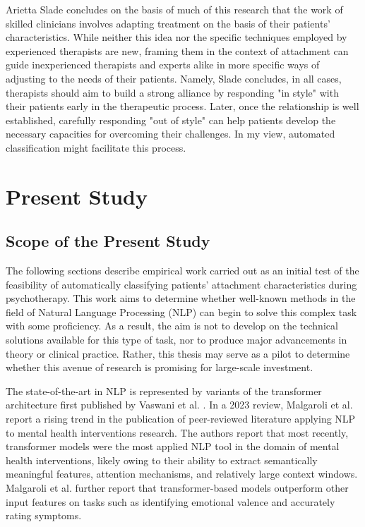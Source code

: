 \documentclass[12pt]{report}
\begin{document}
Arietta Slade \citeyear{Slade2016} concludes on the basis of much of this research that the work of skilled clinicians involves adapting treatment on the basis of their patients' characteristics.
While neither this idea nor the specific techniques employed by experienced therapists are new, framing them in the context of attachment can guide inexperienced therapists and experts alike in more specific ways of adjusting to the needs of their patients.
Namely, Slade \citeyear{Slade2016} concludes, in all cases, therapists should aim to build a strong alliance by responding "in style" with their patients early in the therapeutic process.
Later, once the relationship is well established, carefully responding "out of style" can help patients develop the necessary capacities for overcoming their challenges.
In my view, automated classification might facilitate this process.

\chapter{Present Study}
\section{Scope of the Present Study}
The following sections describe empirical work carried out as an initial test of the feasibility of automatically classifying patients' attachment characteristics during psychotherapy.
This work aims to determine whether well-known methods in the field of Natural Language Processing (NLP) can begin to solve this complex task with some proficiency.
As a result, the aim is not to develop on the technical solutions available for this type of task, nor to produce major advancements in theory or clinical practice.
Rather, this thesis may serve as a pilot to determine whether this avenue of research is promising for large-scale investment.

The state-of-the-art in NLP is represented by variants of the transformer architecture first published by Vaswani et al. \citeyear{Vaswani2017}.
In a 2023 review, Malgaroli et al. \citeyear{Malgaroli2023} report a rising trend in the publication of peer-reviewed literature applying NLP to mental health interventions research.
The authors report that most recently, transformer models were the most applied NLP tool in the domain of mental health interventions, likely owing to their ability to extract semantically meaningful features, attention mechanisms, and relatively large context windows.
Malgaroli et al. \citeyear{Malgaroli2023} further report that transformer-based models outperform other input features on tasks such as identifying emotional valence and accurately rating symptoms.
\end{document}
